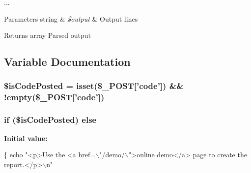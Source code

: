 ... 
\begin{DoxyParams}[1]{Parameters}
string & {\em \$output} & Output lines \\
\hline
\end{DoxyParams}
\begin{DoxyReturn}{Returns}
array Parsed output 
\end{DoxyReturn}


\subsection{Variable Documentation}
\hypertarget{demo_2report_2index_8php_a005f06736bced8ede9bef8b0fc42966d}{
\subsubsection[{\$is\-Code\-Posted}]{\setlength{\rightskip}{0pt plus 5cm}\$is\-Code\-Posted = isset(\$\-\_\-\-P\-O\-S\-T\mbox{[}'code'\mbox{]}) \&\& !empty(\$\-\_\-\-P\-O\-S\-T\mbox{[}'code'\mbox{]})}}\label{demo_2report_2index_8php_a005f06736bced8ede9bef8b0fc42966d}
\hypertarget{demo_2report_2index_8php_a63d14b9f7ac9b37e5a7aa176c88ee9f3}{
\subsubsection[{else}]{\setlength{\rightskip}{0pt plus 5cm}if (\$is\-Code\-Posted) else}}\label{demo_2report_2index_8php_a63d14b9f7ac9b37e5a7aa176c88ee9f3}
{\bfseries Initial value\-:}
\begin{DoxyCode}
\{
    echo \textcolor{stringliteral}{"<p>Use the <a href=\(\backslash\)"/demo/\(\backslash\)">online demo</a> page to create the
       report.</p>\(\backslash\)n"}
\end{DoxyCode}
